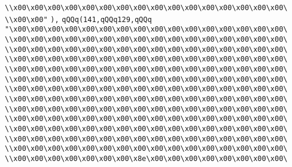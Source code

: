 \verb|\\x00\x00\x00\x00\x00\x00\x00\x00\x00\x00\x00\x00\x00\x00\x00\x00\|\newline
\verb|\\x00\x00"|\newline
\verb|),|\newline
\verb|qQQq(141,qQQq129,qQQq|\newline
\verb|"\x00\x00\x00\x00\x00\x00\x00\x00\x00\x00\x00\x00\x00\x00\x00\x00\|\newline
\verb|\\x00\x00\x00\x00\x00\x00\x00\x00\x00\x00\x00\x00\x00\x00\x00\x00\|\newline
\verb|\\x00\x00\x00\x00\x00\x00\x00\x00\x00\x00\x00\x00\x00\x00\x00\x00\|\newline
\verb|\\x00\x00\x00\x00\x00\x00\x00\x00\x00\x00\x00\x00\x00\x00\x00\x00\|\newline
\verb|\\x00\x00\x00\x00\x00\x00\x00\x00\x00\x00\x00\x00\x00\x00\x00\x00\|\newline
\verb|\\x00\x00\x00\x00\x00\x00\x00\x00\x00\x00\x00\x00\x00\x00\x00\x00\|\newline
\verb|\\x00\x00\x00\x00\x00\x00\x00\x00\x00\x00\x00\x00\x00\x00\x00\x00\|\newline
\verb|\\x00\x00\x00\x00\x00\x00\x00\x00\x00\x00\x00\x00\x00\x00\x00\x00\|\newline
\verb|\\x00\x00\x00\x00\x00\x00\x00\x00\x00\x00\x00\x00\x00\x00\x00\x00\|\newline
\verb|\\x00\x00\x00\x00\x00\x00\x00\x00\x00\x00\x00\x00\x00\x00\x00\x00\|\newline
\verb|\\x00\x00\x00\x00\x00\x00\x00\x00\x00\x00\x00\x00\x00\x00\x00\x00\|\newline
\verb|\\x00\x00\x00\x00\x00\x00\x00\x00\x00\x00\x00\x00\x00\x00\x00\x00\|\newline
\verb|\\x00\x00\x00\x00\x00\x00\x00\x00\x00\x00\x00\x00\x00\x00\x00\x00\|\newline
\verb|\\x00\x00\x00\x00\x00\x00\x00\x8e\x00\x00\x00\x00\x00\x00\x00\x00\|\newline
